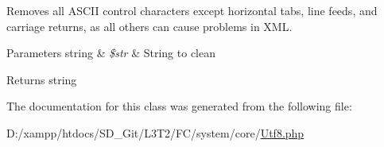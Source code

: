 Removes all A\+S\+C\+I\+I control characters except horizontal tabs, line feeds, and carriage returns, as all others can cause problems in X\+M\+L.


\begin{DoxyParams}[1]{Parameters}
string & {\em \$str} & String to clean \\
\hline
\end{DoxyParams}
\begin{DoxyReturn}{Returns}
string 
\end{DoxyReturn}


The documentation for this class was generated from the following file\+:\begin{DoxyCompactItemize}
\item 
D\+:/xampp/htdocs/\+S\+D\+\_\+\+Git/\+L3\+T2/\+F\+C/system/core/\hyperlink{system_2core_2_utf8_8php}{Utf8.\+php}\end{DoxyCompactItemize}
